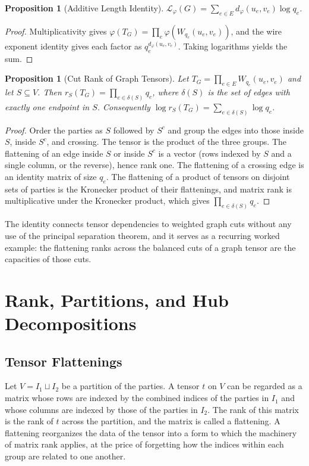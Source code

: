 \documentclass[11pt,letterpaper]{report}
\theoremstyle{plain}
\newtheorem{proposition}[theorem]{Proposition}
\theoremstyle{definition}
\theoremstyle{remark}
\begin{document}
\begin{proposition}[Additive Length Identity]
$\mathcal L_\varphi(G)=\sum_{e\in E}d_\varphi(u_e,v_e)\log q_e$.
\end{proposition}
\begin{proof}
Multiplicativity gives $\varphi(T_G)=\prod_e\varphi(W_{q_e}(u_e,v_e))$, and the wire exponent identity gives each factor as $q_e^{d_\varphi(u_e,v_e)}$. Taking logarithms yields the sum.
\end{proof}

\begin{proposition}[Cut Rank of Graph Tensors]\label{pr:cutrank}
Let $T_G=\prod_{e\in E}W_{q_e}(u_e,v_e)$ and let $S\subseteq V$. Then $r_S(T_G)=\prod_{e\in\delta(S)}q_e$, where $\delta(S)$ is the set of edges with exactly one endpoint in $S$. Consequently $\log r_S(T_G)=\sum_{e\in\delta(S)}\log q_e$.
\end{proposition}
\begin{proof}
Order the parties as $S$ followed by $S^c$ and group the edges into those inside $S$, inside $S^c$, and crossing. The tensor is the product of the three groups. The flattening of an edge inside $S$ or inside $S^c$ is a vector (rows indexed by $S$ and a single column, or the reverse), hence rank one. The flattening of a crossing edge is an identity matrix of size $q_e$. The flattening of a product of tensors on disjoint sets of parties is the Kronecker product of their flattenings, and matrix rank is multiplicative under the Kronecker product, which gives $\prod_{e\in\delta(S)}q_e$.
\end{proof}

The identity connects tensor dependencies to weighted graph cuts without any use of the principal separation theorem, and it serves as a recurring worked example: the flattening ranks across the balanced cuts of a graph tensor are the capacities of those cuts.

\chapter{Rank, Partitions, and Hub Decompositions}

\section{Tensor Flattenings}

Let $V=I_1\sqcup I_2$ be a partition of the parties. A tensor $t$ on $V$ can be regarded as a matrix whose rows are indexed by the combined indices of the parties in $I_1$ and whose columns are indexed by those of the parties in $I_2$. The rank of this matrix is the rank of $t$ across the partition, and the matrix is called a flattening. A flattening reorganizes the data of the tensor into a form to which the machinery of matrix rank applies, at the price of forgetting how the indices within each group are related to one another.
\end{document}

